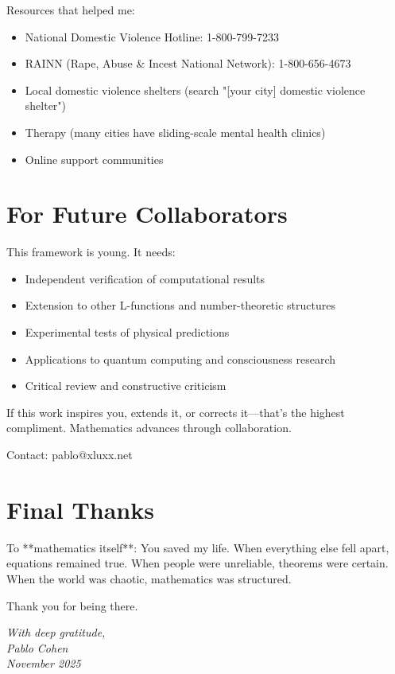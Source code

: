 Resources that helped me:
\begin{itemize}
\item National Domestic Violence Hotline: 1-800-799-7233
\item RAINN (Rape, Abuse \& Incest National Network): 1-800-656-4673
\item Local domestic violence shelters (search "[your city] domestic violence shelter")
\item Therapy (many cities have sliding-scale mental health clinics)
\item Online support communities
\end{itemize}

\section*{For Future Collaborators}

This framework is young. It needs:
\begin{itemize}
\item Independent verification of computational results
\item Extension to other L-functions and number-theoretic structures
\item Experimental tests of physical predictions
\item Applications to quantum computing and consciousness research
\item Critical review and constructive criticism
\end{itemize}

If this work inspires you, extends it, or corrects it—that's the highest compliment. Mathematics advances through collaboration.

Contact: pablo@xluxx.net

\section*{Final Thanks}

To **mathematics itself**: You saved my life. When everything else fell apart, equations remained true. When people were unreliable, theorems were certain. When the world was chaotic, mathematics was structured.

Thank you for being there.

\vspace{1cm}

\begin{flushright}
\textit{With deep gratitude,}\\
\textit{Pablo Cohen}\\
\textit{November 2025}
\end{flushright}

\endgroup
